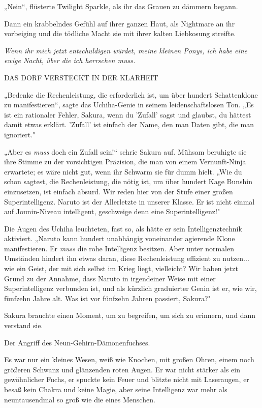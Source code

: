 {„Nein“, flüsterte Twilight Sparkle, als ihr das Grauen zu dämmern begann.

Dann ein krabbelndes Gefühl auf ihrer ganzen Haut, als Nightmare an ihr vorbeiging und die tödliche Macht sie mit ihrer kalten Liebkosung streifte.

\emph{\emph{Wenn ihr mich jetzt entschuldigen würdet, meine kleinen Ponys, ich habe eine ewige Nacht, über die ich herrschen muss.}}

DAS DORF VERSTECKT IN DER KLARHEIT

„Bedenke die Rechenleistung, die erforderlich ist, um über hundert Schattenklone zu manifestieren“, sagte das Uchiha-Genie in seinem leidenschaftslosen Ton. „Es ist ein rationaler Fehler, Sakura, wenn du 'Zufall' sagst und glaubst, du hättest damit etwas erklärt. 'Zufall' ist einfach der Name, den man Daten gibt, die man ignoriert."

„Aber es \emph{muss} doch ein Zufall sein!“ schrie Sakura auf. Mühsam beruhigte sie ihre Stimme zu der vorsichtigen Präzision, die man von einem Vernunft-Ninja erwartete; es wäre nicht gut, wenn ihr Schwarm sie für dumm hielt. „Wie du schon sagtest, die Rechenleistung, die nötig ist, um über hundert Kage Bunshin einzusetzen, ist einfach absurd. Wir reden hier von der Stufe einer großen Superintelligenz. Naruto ist der Allerletzte in unserer Klasse. Er ist nicht einmal auf Jounin-Niveau intelligent, geschweige denn eine Superintelligenz!"

Die Augen des Uchiha leuchteten, fast so, als hätte er sein Intelligenztechnik aktiviert. „Naruto kann hundert unabhängig voneinander agierende Klone manifestieren. Er \emph{muss} die rohe Intelligenz besitzen. Aber unter normalen Umständen hindert ihn etwas daran, diese Rechenleistung effizient zu nutzen... wie ein Geist, der mit sich selbst im Krieg liegt, vielleicht? Wir haben jetzt Grund zu der Annahme, dass Naruto in irgendeiner Weise mit einer Superintelligenz verbunden ist, und als kürzlich graduierter Genin ist er, wie wir, fünfzehn Jahre alt. Was ist vor fünfzehn Jahren passiert, Sakura?"

Sakura brauchte einen Moment, um zu begreifen, um sich zu erinnern, und dann verstand sie.

Der Angriff des Neun-Gehirn-Dämonenfuchses.

Es war nur ein kleines Wesen, weiß wie Knochen, mit großen Ohren, einem noch größeren Schwanz und glänzenden roten Augen. Er war nicht stärker als ein gewöhnlicher Fuchs, er spuckte kein Feuer und blitzte nicht mit Laseraugen, er besaß kein Chakra und keine Magie, aber seine Intelligenz war mehr als neuntausendmal so groß wie die eines Menschen.

}
